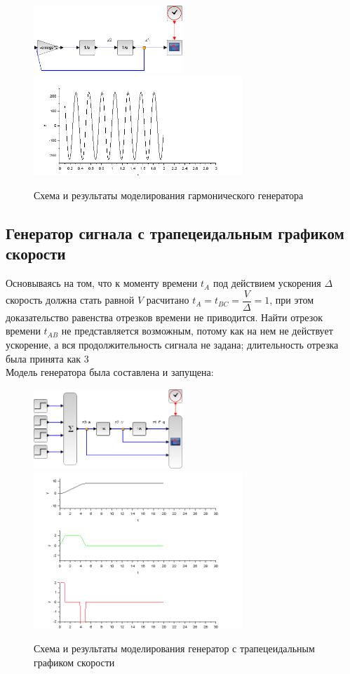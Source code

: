 \documentclass[a4paper,12pt,russian]{article} %
\begin{document}
\begin{figure}[H]
	\includegraphics[width=0.5\textwidth]{signal_generator}
	\includegraphics[width=0.7\textwidth]{signal_generator-plot}
	\caption{Схема и результаты моделирования гармонического генератора}
\end{figure}

\subsection{Генератор сигнала с трапецеидальным графиком скорости}
Основываясь на том, что к моменту времени $t_A$ под действием ускорения $\Delta$ скорость должна стать равной $V$ расчитано $t_A=t_{BC}=\dfrac{V}{\Delta}=1$, при этом доказательство равенства отрезков времени не приводится. Найти отрезок времени $t_{AB}$ не представляется возможным, потому как на нем не действует ускорение, а вся продолжительность сигнала не задана; длительность отрезка была принята как 3\\
Модель генератора была составлена и запущена:\\
\begin{figure}[H]
	\includegraphics[width=0.5\textwidth]{trapec}
	\includegraphics[width=0.7\textwidth]{trapec-plot}
	\caption{Схема и результаты моделирования генератор с трапецеидальным графиком скорости }
\end{figure}
\end{document}
